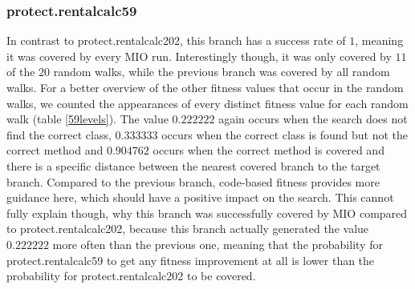 \subsubsection{protect.rentalcalc59}
In contrast to protect.rentalcalc202, this branch has a success rate of $1$, meaning it was covered by every MIO run.
Interestingly though, it was only covered by $11$ of the $20$ random walks, while the previous branch was covered by all random walks.
For a better overview of the other fitness values that occur in the random walks, we counted the appearances of every distinct fitness value for each random walk (table \ref{59levels}).
The value $0.222222$ again occurs when the search does not find the correct class, $0.333333$ occurs when the correct class is found but not the correct method and
$0.904762$ occurs when the correct method is covered and there is a specific distance between the nearest covered branch to the target branch.
Compared to the previous branch, code-based fitness provides more guidance here, which should have a positive impact on the search.
This cannot fully explain though, why this branch was successfully covered by MIO compared to protect.rentalcalc202, because this branch actually generated the value $0.222222$ more often than the previous one, meaning that the probability for protect.rentalcalc59 to get any fitness improvement at all is lower than the probability for protect.rentalcalc202 to be covered.

